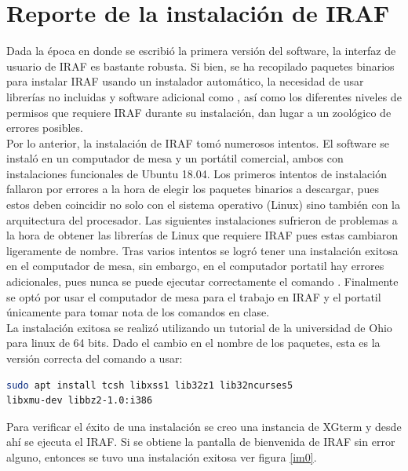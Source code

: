 \documentclass[12pt]{article}
\begin{document}
\section{Reporte de la instalación de IRAF}
Dada la época en donde se escribió la primera versión del software, la interfaz de usuario de IRAF es bastante robusta. Si bien, se ha recopilado paquetes binarios para instalar IRAF usando un instalador automático, la necesidad de usar librerías no incluidas y software adicional como , así como los diferentes niveles de permisos que requiere IRAF durante su instalación, dan lugar a un zoológico de errores posibles.\\
Por lo anterior, la instalación de IRAF tomó numerosos intentos. El software se instaló en un computador de mesa y un portátil comercial, ambos con instalaciones funcionales de Ubuntu 18.04. Los primeros intentos de instalación fallaron por errores a la hora de elegir los paquetes binarios a descargar, pues estos deben coincidir no solo con el sistema operativo (Linux) sino también con la arquitectura del procesador. Las siguientes instalaciones sufrieron de problemas a la hora de obtener las librerías de Linux que requiere IRAF pues estas cambiaron ligeramente de nombre. Tras varios intentos se logró tener una instalación exitosa en el computador de mesa, sin embargo, en el computador portatil hay errores adicionales, pues nunca se puede ejecutar correctamente el comando . Finalmente se optó por usar el computador de mesa para el trabajo en IRAF y el portatil únicamente para tomar nota de los comandos en clase.\\
La instalación exitosa se realizó utilizando un tutorial de la universidad de Ohio para linux de 64 bits\cite{OhioTutorial}. Dado el cambio en el nombre de los paquetes, esta es la versión correcta del comando a usar:

\begin{lstlisting}[language=bash]
sudo apt install tcsh libxss1 lib32z1 lib32ncurses5 
libxmu-dev libbz2-1.0:i386 
\end{lstlisting}

Para verificar el éxito de una instalación se creo una instancia de XGterm y desde ahí se ejecuta el IRAF. Si se obtiene la pantalla de bienvenida de IRAF sin error alguno, entonces se tuvo una instalación exitosa ver figura \ref{im0}.
\end{document}
